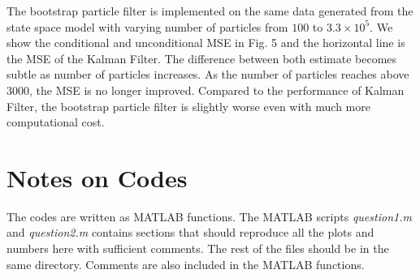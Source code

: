 \documentclass[a4paper, 11pt]{article}
\begin{document}
The bootstrap particle filter is implemented on the same data generated from the state space model with varying number of particles from $100$ to $3.3\times 10^5$. We show the conditional and unconditional MSE in Fig. 5 and the horizontal line is the MSE of the Kalman Filter. The difference between both estimate becomes subtle as number of particles increases. As the number of particles reaches above $3000$, the MSE is no longer improved. Compared to the performance of Kalman Filter, the bootstrap particle filter is slightly worse even with much more computational cost.


\section*{Notes on Codes}
The codes are written as MATLAB functions. The MATLAB scripts \textit{question1.m} and \textit{question2.m} contains sections that should reproduce all the plots and numbers here with sufficient comments. The rest of the files should be in the same directory. Comments are also included in the MATLAB functions.  
\end{document}
